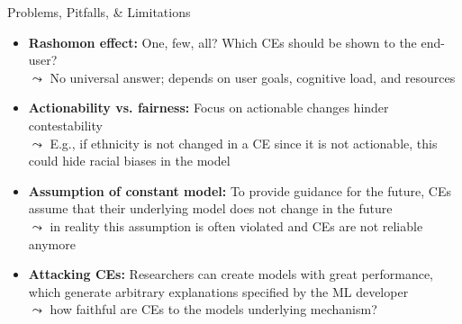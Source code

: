 \documentclass[11pt,compress,t,notes=noshow, aspectratio=169, xcolor=table]{beamer}
\begin{document}
\begin{frame}{Problems, Pitfalls, \& Limitations}
\begin{itemize}[<+->]
    \item \textbf{Rashomon effect:} One, few, all? Which CEs should be shown to the end-user?\\
    $\leadsto$ No universal answer; depends on user goals, cognitive load, and resources
    \item \textbf{Actionability vs. fairness:} Focus on actionable changes hinder contestability\\
$\leadsto$ E.g., if ethnicity is not changed in a CE since it is not actionable, this could hide racial biases in the model

    \item \textbf{Assumption of constant model:} To provide guidance for the future, CEs assume that their underlying model does not change in the future\\
    $\leadsto$ in reality this assumption is often violated and CEs are not reliable anymore 
    \item \textbf{Attacking CEs:} Researchers can create models with great performance, which generate arbitrary explanations specified by the ML developer\\
    $\leadsto$ how faithful are CEs to the models underlying mechanism?
\end{itemize}


\end{frame}
\end{document}
